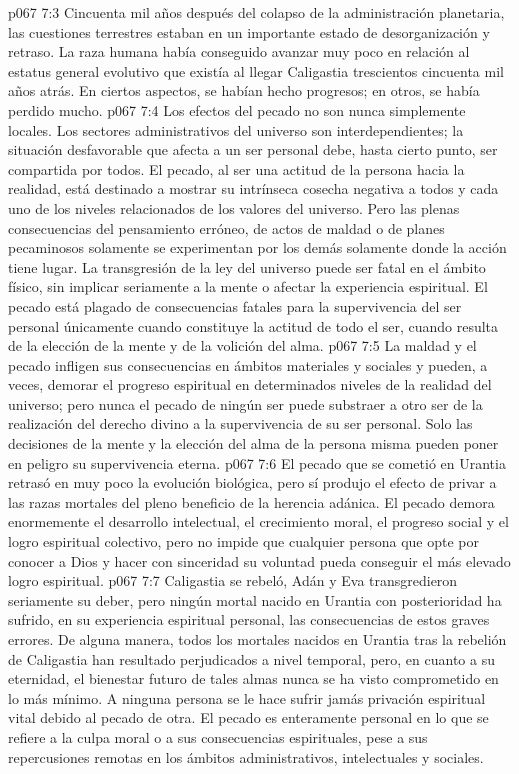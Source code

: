 \vs p067 7:3 Cincuenta mil años después del colapso de la administración planetaria, las cuestiones terrestres estaban en un importante estado de desorganización y retraso. La raza humana había conseguido avanzar muy poco en relación al estatus general evolutivo que existía al llegar Caligastia trescientos cincuenta mil años atrás. En ciertos aspectos, se habían hecho progresos; en otros, se había perdido mucho.
\vs p067 7:4 Los efectos del pecado no son nunca simplemente locales. Los sectores administrativos del universo son interdependientes; la situación desfavorable que afecta a un ser personal debe, hasta cierto punto, ser compartida por todos. El pecado, al ser una actitud de la persona hacia la realidad, está destinado a mostrar su intrínseca cosecha negativa a todos y cada uno de los niveles relacionados de los valores del universo. Pero las plenas consecuencias del pensamiento erróneo, de actos de maldad o de planes pecaminosos solamente se experimentan por los demás solamente donde la acción tiene lugar. La transgresión de la ley del universo puede ser fatal en el ámbito físico, sin implicar seriamente a la mente o afectar la experiencia espiritual. El pecado está plagado de consecuencias fatales para la supervivencia del ser personal únicamente cuando constituye la actitud de todo el ser, cuando resulta de la elección de la mente y de la volición del alma.
\vs p067 7:5 La maldad y el pecado infligen sus consecuencias en ámbitos materiales y sociales y pueden, a veces, demorar el progreso espiritual en determinados niveles de la realidad del universo; pero nunca el pecado de ningún ser puede substraer a otro ser de la realización del derecho divino a la supervivencia de su ser personal. Solo las decisiones de la mente y la elección del alma de la persona misma pueden poner en peligro su supervivencia eterna.
\vs p067 7:6 El pecado que se cometió en Urantia retrasó en muy poco la evolución biológica, pero sí produjo el efecto de privar a las razas mortales del pleno beneficio de la herencia adánica. El pecado demora enormemente el desarrollo intelectual, el crecimiento moral, el progreso social y el logro espiritual colectivo, pero no impide que cualquier persona que opte por conocer a Dios y hacer con sinceridad su voluntad pueda conseguir el más elevado logro espiritual.
\vs p067 7:7 Caligastia se rebeló, Adán y Eva transgredieron seriamente su deber, pero ningún mortal nacido en Urantia con posterioridad ha sufrido, en su experiencia espiritual personal, las consecuencias de estos graves errores. De alguna manera, todos los mortales nacidos en Urantia tras la rebelión de Caligastia han resultado perjudicados a nivel temporal, pero, en cuanto a su eternidad, el bienestar futuro de tales almas nunca se ha visto comprometido en lo más mínimo. A ninguna persona se le hace sufrir jamás privación espiritual vital debido al pecado de otra. El pecado es enteramente personal en lo que se refiere a la culpa moral o a sus consecuencias espirituales, pese a sus repercusiones remotas en los ámbitos administrativos, intelectuales y sociales.
